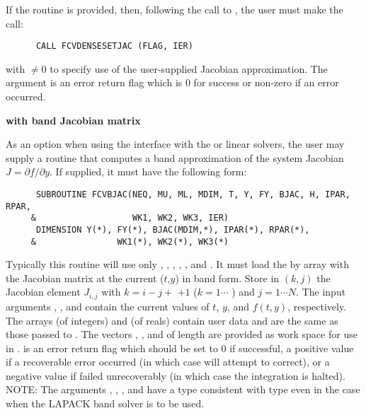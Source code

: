 \begin{Steps}
  If the  routine is provided, then, following the call to , 
  the user must make the call:
\begin{verbatim}
      CALL FCVDENSESETJAC (FLAG, IER)
\end{verbatim}
  with  $\neq 0$ to specify use of the user-supplied Jacobian
  approximation.  The argument  is an error return flag which is $0$ 
  for success or non-zero if an error occurred.

  {\bf {\cvls} with band Jacobian matrix}

  As an option when using the {\cvls} interface with the
  {\sunlinsolband} or {\sunlinsollapband} linear solvers, the user may
  supply a routine that computes a band approximation of the system
  Jacobian  $J = \partial f / \partial y$. If supplied, it must have
  the following form:
\begin{verbatim}
      SUBROUTINE FCVBJAC(NEQ, MU, ML, MDIM, T, Y, FY, BJAC, H, IPAR, RPAR,
     &                   WK1, WK2, WK3, IER)
      DIMENSION Y(*), FY(*), BJAC(MDIM,*), IPAR(*), RPAR(*),
     &                WK1(*), WK2(*), WK3(*)
\end{verbatim}
  Typically this routine will use only , , , , 
  , and .
  It must load the  by  array  with the Jacobian matrix
  at the current ($t$,$y$) in band form.  Store in $(k,j)$ the Jacobian
  element $J_{i,j}$ with $k = i - j + $  $ + 1$ ($k = 1 \cdots $
  ) and $j = 1 \cdots N$.
  The input arguments , , and  contain the current
  values of $t$, $y$, and $f(t,y)$, respectively.
  The arrays  (of integers) and  (of reals) contain user data
  and are the same as those passed to .
  The vectors , ,
  and  of length  are provided as work space for use in
  .
   is an error return flag which should be set to $0$ if successful, 
  a positive value if a recoverable error occurred (in which case {\cvode} will 
  attempt to correct), or a negative value if  failed unrecoverably 
  (in which case the integration is halted).
  NOTE: The arguments , , , and  have a type
  consistent with {\CC} type  even in the case when the LAPACK band
  solver is to be used.


\end{Steps}
